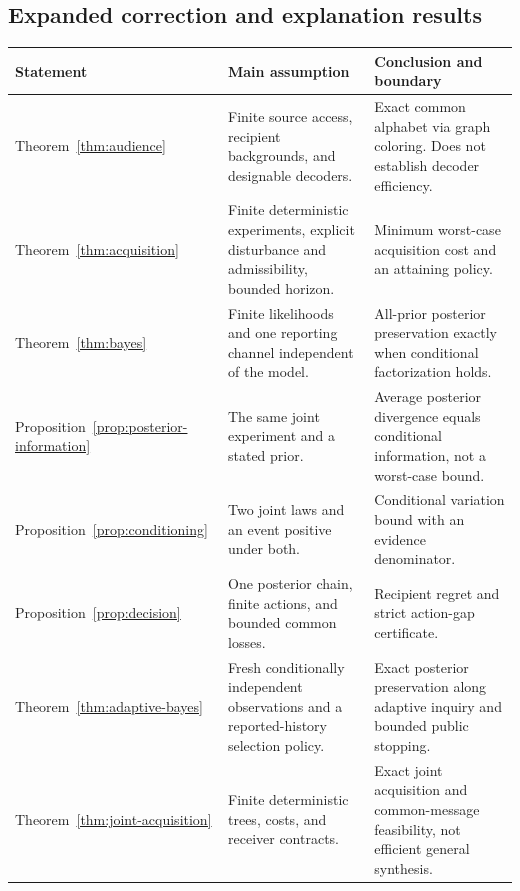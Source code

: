 \documentclass[11pt,letterpaper]{article}
\theoremstyle{plain}
\theoremstyle{definition}
\begin{document}
\subsection{Expanded correction and explanation results}
\begin{center}\small
\begin{tabularx}{\textwidth}{@{}P{1.1in}P{1.55in}X@{}}\toprule
Statement & Main assumption & Conclusion and boundary\\\midrule
Theorem~\ref{thm:audience} & Finite source access, recipient backgrounds, and designable decoders. & Exact common alphabet via graph coloring. Does not establish decoder efficiency.\\
Theorem~\ref{thm:acquisition} & Finite deterministic experiments, explicit disturbance and admissibility, bounded horizon. & Minimum worst-case acquisition cost and an attaining policy.\\
Theorem~\ref{thm:bayes} & Finite likelihoods and one reporting channel independent of the model. & All-prior posterior preservation exactly when conditional factorization holds.\\
Proposition~\ref{prop:posterior-information} & The same joint experiment and a stated prior. & Average posterior divergence equals conditional information, not a worst-case bound.\\
Proposition~\ref{prop:conditioning} & Two joint laws and an event positive under both. & Conditional variation bound with an evidence denominator.\\
Proposition~\ref{prop:decision} & One posterior chain, finite actions, and bounded common losses. & Recipient regret and strict action-gap certificate.\\
Theorem~\ref{thm:adaptive-bayes} & Fresh conditionally independent observations and a reported-history selection policy. & Exact posterior preservation along adaptive inquiry and bounded public stopping.\\
Theorem~\ref{thm:joint-acquisition} & Finite deterministic trees, costs, and receiver contracts. & Exact joint acquisition and common-message feasibility, not efficient general synthesis.\\\bottomrule
\end{tabularx}\end{center}
\end{document}
